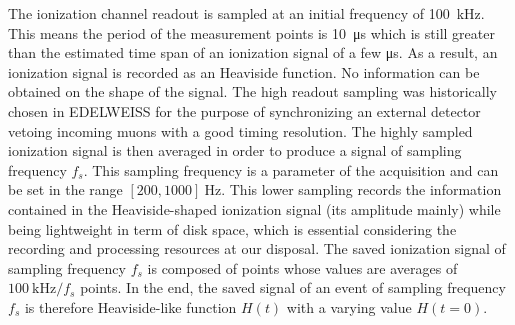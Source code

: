 The ionization channel readout is sampled at an initial frequency of \SI{100}{\kilo\Hz}. This means the period of the  measurement points is \SI{10}{\micro\s} which is still greater than the estimated time span of an ionization signal of a few \si{\micro\s}. As a result, an ionization signal is recorded as an Heaviside function. No information can be obtained on the shape of the signal. The high readout sampling was historically chosen in EDELWEISS for the purpose of synchronizing an external detector vetoing incoming muons with a good timing resolution. The highly sampled ionization signal is then averaged in order to produce a signal of sampling frequency $f_s$. This sampling frequency is a parameter of the acquisition and can be set in the range $[200, 1000]\ \si{\Hz}$. This lower sampling records the information contained in the Heaviside-shaped ionization signal (its amplitude mainly) while being lightweight in term of disk space, which is essential considering the recording and processing resources at our disposal. The saved ionization signal of sampling frequency $f_s$ is composed of points whose values are averages of $\SI{100}{\kilo\Hz}/f_s$ points. In the end, the saved signal of an event of sampling frequency $f_s$ is therefore Heaviside-like function $H(t)$ with a varying value $H(t=0)$.

